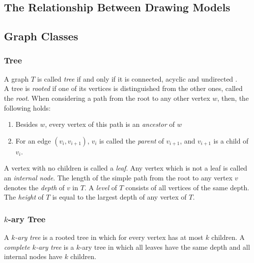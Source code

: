 \subsection{The Relationship Between Drawing Models}


\subsection{Graph Classes}
\subsubsection{Tree}
A graph $T$ is called \emph{tree} if and only if it is connected, acyclic and undirected \cite[P. 1172]{DBLP:cormen_intro_to_algorithms}.\\
A tree is \emph{rooted} if one of its vertices is distinguished from the other ones, called the \emph{root}.
When considering a path from the root to any other vertex $w$, then, the following holds:
\begin{enumerate}
	\item Besides $w$, every vertex of this path is an \emph{ancestor} of $w$
	\item For an edge $(v_i,v_{i+1})$, $v_i$ is called the \emph{parent} of $v_{i+1}$, and $v_{i+1}$ is a child of $v_i$.
\end{enumerate}
A vertex with no children is called a \emph{leaf}. Any vertex which is not a leaf is called an \emph{internal node}.
The length of the simple path from the root to any vertex $v$ denotes the \emph{depth} of $v$ in $T$.
A \emph{level} of $T$ consists of all vertices of the same depth.
The \emph{height} of $T$ is equal to the largest depth of any vertex of $T$. \cite[P. 1176ff]{DBLP:cormen_intro_to_algorithms}
\subsubsection{$k$-ary Tree}
A \emph{$k$-ary tree} is a rooted tree in which for every vertex has at most $k$ children.
A \emph{complete $k$-ary tree} is a $k$-ary tree in which all leaves have the same depth and all internal nodes have $k$ children.

